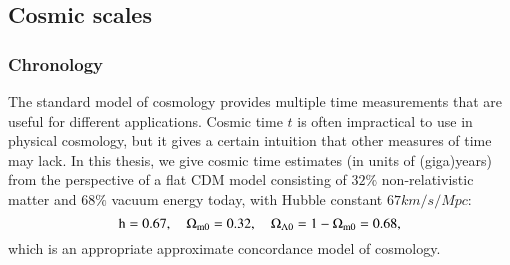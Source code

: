 \subsection{Cosmic scales}





    \subsubsection{Chronology}
    The standard model of cosmology provides multiple time measurements that are useful for different applications. 
    Cosmic time $t$ is often impractical to use in physical cosmology, but it gives a certain intuition that other measures of time may lack. In this thesis, we give cosmic time estimates (in units of (giga)years) from the perspective of a flat \textLambda{}CDM model consisting of $32\%$ non-relativistic matter and $68\%$ vacuum energy today, with Hubble constant $67\unit{km/s/Mpc}$: 
    \begin{equation}\label{eq:intro:prelim:cosmic_time_parameter_default}
        \mathrm{h}=0.67, \quad \Omega_\mathrm{m0} = 0.32, \quad \Omega_{\Lambda 0} = 1 -  \Omega_\mathrm{m0} = 0.68,
    \end{equation}
    which is an appropriate approximate concordance model of cosmology. 

